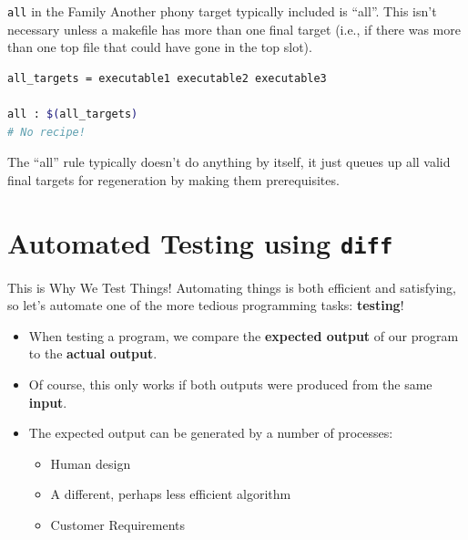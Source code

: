 \documentclass[11pt]{beamer}
\begin{document}
\begin{frame}[fragile=singleslide]{\texttt{all} in the Family}
Another phony target typically included is ``all''.  This isn't necessary unless a makefile has more than one final target (i.e., if there was more than one top file that could have gone in the top slot).  
\begin{lstlisting}[style = terminal, language=bash]
all_targets = executable1 executable2 executable3

all : $(all_targets)
# No recipe! 
\end{lstlisting}
The ``all'' rule typically doesn't do anything by itself, it just queues up all valid final targets for regeneration by making them prerequisites.  
\end{frame}

\section[Testing]{Automated Testing using \texttt{diff}}
\begin{frame}{This is Why We Test Things!}
Automating things is both efficient and satisfying, so let's automate one of the more tedious programming tasks: \textbf{testing}!
\begin{itemize}
\item When testing a program, we compare the \textbf{expected output} of our program to the \textbf{actual output}.
\item Of course, this only works if both outputs were produced from the same \textbf{input}.
\item The expected output can be generated by a number of processes:
\begin{itemize}
\item Human design
\item A different, perhaps less efficient algorithm 
\item Customer Requirements
\end{itemize}
\end{itemize}
\end{frame}
\end{document}
